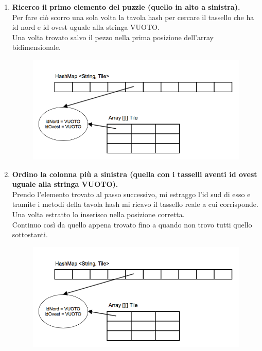	\begin{enumerate}
		\item \textbf{Ricerco il primo elemento del puzzle (quello in alto a sinistra).} \\
Per fare ciò scorro una sola volta la tavola hash per cercare il tassello che ha id nord e id ovest uguale alla stringa VUOTO. \\
Una volta trovato salvo il pezzo nella prima posizione dell'array bidimensionale.
		\begin{figure}[htbp]
			\centering
			\includegraphics[width=15cm]{img/algpuzzle_step1.png}
		\end{figure}
		
		\item \textbf{Ordino la colonna più a sinistra (quella con i tasselli aventi id ovest uguale alla stringa VUOTO).} \\
Prendo l'elemento trovato al passo successivo, mi estraggo l'id sud di esso e tramite i metodi della tavola hash mi ricavo il tassello reale a cui corrisponde. \\
Una volta estratto lo inserisco nella posizione corretta. \\
Continuo così da quello appena trovato fino a quando non trovo tutti quello sottostanti.
		\begin{figure}[htbp]
			\centering
			\includegraphics[width=15cm]{img/algpuzzle_step1.png}
		\end{figure}


\end{enumerate}

